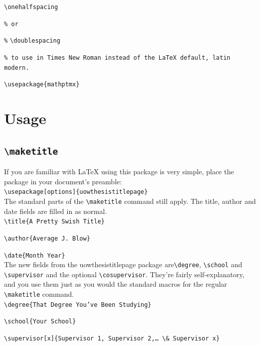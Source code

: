 \documentclass[12pt,oneside]{article}
\newcommand{\option}[1]{\texttt{\color{UOWblue}#1}}
\newcommand{\command}[1]{\texttt{\color{UOWred}#1}}
\newcommand{\comoptions}[1]{\texttt{\color{UOWdarkblue}#1}}
\begin{document}
\command{\textbackslash{}onehalfspacing}

\texttt{\% or}

\texttt{\%} \command{\textbackslash{}doublespacing}

\texttt{\% to use in Times New Roman instead of the LaTeX default, latin modern.}

\command{\textbackslash{}usepackage}\comoptions{\{mathptmx\}}


\section{Usage}
\subsection*{\command{\textbackslash{}maketitle}}
If you are familiar with \LaTeX{} using this package is very simple, place the package in your document's preamble:\\

\command{\textbackslash{}usepackage}\option{[options]}\comoptions{\{uowthesistitlepage\}}\\

\noindent The standard parts of the \command{\textbackslash{}maketitle} command still apply. The title, author and date fields are filled in as normal.\\

\command{\textbackslash{}title}\comoptions{\{A Pretty Swish Title\}}

\command{\textbackslash{}author}\comoptions{\{Average J. Blow\}}

\command{\textbackslash{}date}\comoptions{\{Month Year\}}\\

The new fields from the uowthesistitlepage package are\command{\textbackslash{}degree}, \command{\textbackslash{}school} and \command{\textbackslash{}supervisor} and the optional \command{\textbackslash{}cosupervisor}. They're fairly self-explanatory, and you use them just as you would the standard macros for the regular \command{\textbackslash{}maketitle} command.\\
  
\command{\textbackslash{}degree}\comoptions{\{That Degree You've Been Studying\}}
 
\command{\textbackslash{}school}\comoptions{\{Your School\}}

\command{\textbackslash{}supervisor}\option{[x]}\comoptions{\{Supervisor 1, Supervisor 2,\ldots{} \textbackslash{}\& Supervisor x\}}\\
\end{document}
